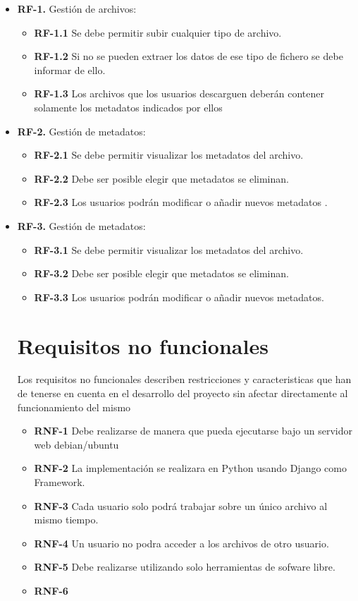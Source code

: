 \begin{itemize}
	\renewcommand{\labelitemi}{$\bullet$}


	\item \textbf{RF-1.} Gestión de archivos:
	\begin{itemize}
		\item \textbf{RF-1.1} Se debe permitir subir cualquier tipo de archivo.
		\item \textbf{RF-1.2} Si no se pueden extraer los datos de ese tipo de fichero se debe informar de ello.
		\item \textbf{RF-1.3} Los archivos que los usuarios descarguen deberán contener solamente los metadatos
		indicados por ellos
	\end{itemize}

	\item \textbf{RF-2.} Gestión de metadatos:
	\begin{itemize}
		\item \textbf{RF-2.1} Se debe permitir visualizar los metadatos del archivo.
		\item \textbf{RF-2.2} Debe ser posible elegir que metadatos se eliminan.
		\item \textbf{RF-2.3} Los usuarios podrán modificar o añadir nuevos metadatos .
	\end{itemize}

	\item \textbf{RF-3.} Gestión de metadatos:
	\begin{itemize}
		\item \textbf{RF-3.1} Se debe permitir visualizar los metadatos del archivo.
		\item \textbf{RF-3.2} Debe ser posible elegir que metadatos se eliminan.
		\item \textbf{RF-3.3} Los usuarios podrán modificar o añadir nuevos metadatos.
	\end{itemize}


\section{Requisitos no funcionales}

Los requisitos no funcionales describen restricciones y caracteristicas que han de tenerse en cuenta en el desarrollo
del proyecto sin afectar directamente al funcionamiento del mismo

\begin{itemize}
	\item \textbf{RNF-1} Debe realizarse de manera que pueda ejecutarse bajo un servidor web debian/ubuntu
	\item \textbf{RNF-2} La implementación se realizara en Python usando Django como Framework.
	\item \textbf{RNF-3} Cada usuario solo podrá trabajar sobre un único archivo al mismo tiempo.
	\item \textbf{RNF-4} Un usuario no podra acceder a los archivos de otro usuario.
	\item \textbf{RNF-5} Debe realizarse utilizando solo herramientas de sofware libre.
	\item \textbf{RNF-6} 

\end{itemize}

\end{itemize}